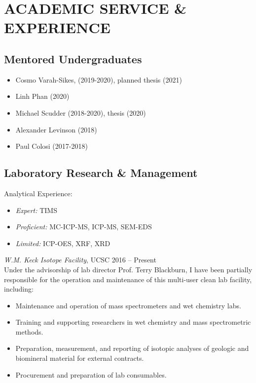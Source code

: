 \documentclass[10pt]{article}
\begin{document}

\section*{ACADEMIC SERVICE \& EXPERIENCE}

\subsection*{\textbf{Mentored Undergraduates}}
\begin{itemize}
		\item Cosmo Varah-Sikes, (2019-2020), planned thesis (2021)
		\item Linh Phan (2020)
		\item Michael Scudder (2018-2020), thesis (2020)
		\item Alexander Levinson (2018)
		\item Paul Colosi (2017-2018)
\end{itemize}

\subsection*{\textbf{Laboratory Research \& Management}}
Analytical Experience:
	\begin{itemize} [label={}]
		\item \textit{Expert:} TIMS
		\item \textit{Proficient:} MC-ICP-MS, ICP-MS, SEM-EDS
		\item \textit{Limited:} ICP-OES, XRF, XRD
	\end{itemize} \vspace{2ex}
	
 \textit{W.M. Keck Isotope Facility}, UCSC \hfill 2016 -- Present\\
Under the advisorship of lab director Prof. Terry Blackburn, I have been partially responsible for the operation and maintenance of this multi-user clean lab facility, including:
	\begin{itemize} 
	\item Maintenance and operation of mass spectrometers and wet chemistry labs.
	\item Training and supporting researchers in wet chemistry and mass spectrometric methods.
	\item Preparation, measurement, and reporting of isotopic analyses of geologic and biomineral material for external contracts.
	\item Procurement and preparation of lab consumables.
	\end{itemize}
	
\end{document}
